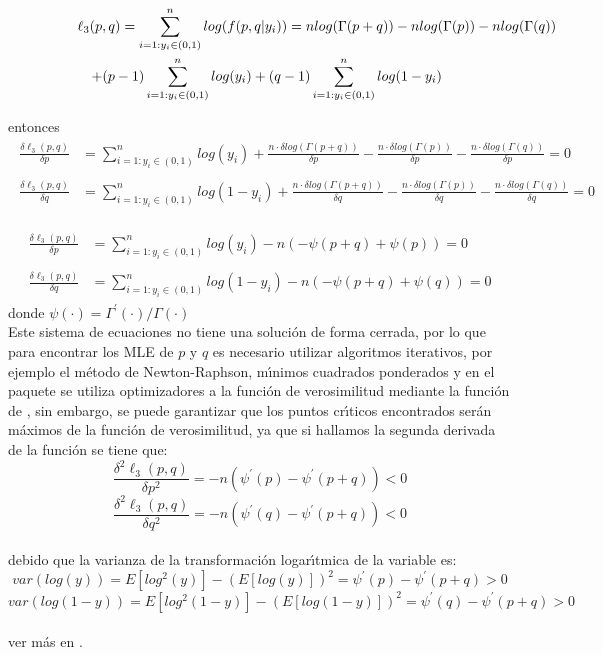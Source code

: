 \begin{enumerate}
\begin{eqnarray*}
 \lefteqn{\ell_3(p,q) = \sum_{i=1:y_i \in (0,1)}^{n}{log(f(p,q|y_i))} = n log(\Gamma(p+q))-n log(\Gamma(p))-n log(\Gamma(q))} \\
& & +(p-1)\sum_{i=1:y_i \in (0,1)}^{n}{log(y_i)}+(q-1)\sum_{i=1:y_i \in (0,1)}^{n}{log(1-y_i)}
\end{eqnarray*}

entonces
\begin{align*}
\begin{split}
\frac{\delta \ell_3(p,q)}{\delta p} &=\sum_{i=1:y_i \in (0,1)}^{n}{log(y_i)}+\frac{n \cdot \delta log(\Gamma(p+q))}{\delta p}- \frac{n \cdot \delta log(\Gamma(p))}{\delta p}-\frac{n\cdot \delta log(\Gamma(q))}{\delta p}=0
\end{split}\\
\begin{split}
\frac{\delta \ell_3(p,q)}{\delta q} &=\sum_{i=1:y_i \in (0,1)}^{n}{log(1-y_i)}+\frac{n \cdot \delta log(\Gamma(p+q))}{\delta q}- \frac{n \cdot \delta log(\Gamma(p))}{\delta q}-\frac{n\cdot \delta log(\Gamma(q))}{\delta q}=0
\end{split}
\end{align*}

\begin{align*}
\begin{split}
\frac{\delta \ell_3(p,q)}{\delta p} &=\sum_{i=1:y_i \in (0,1)}^{n}{log(y_i)}-n(-\psi(p+q)+\psi(p))=0
\end{split}\\
\begin{split}
\frac{\delta \ell_3(p,q)}{\delta q} &=\sum_{i=1:y_i \in (0,1)}^{n}{log(1-y_i)}-n(-\psi(p+q)+\psi(q))=0
\end{split}
\end{align*}
donde $\psi(\cdot)={\Gamma^{'}{(\cdot)}}/{\Gamma(\cdot)}$
\\
Este sistema de ecuaciones no tiene una soluci\'{o}n de forma cerrada, por lo que para encontrar los MLE de $p$ y $q$ es necesario utilizar algoritmos iterativos, por ejemplo el m\'{e}todo de Newton-Raphson, m\'{\i}nimos cuadrados ponderados y en el paquete  se utiliza optimizadores a la funci\'{o}n de verosimilitud mediante la funci\'{o}n  de , sin embargo, se puede garantizar que los puntos cr\'{\i}ticos encontrados ser\'{a}n m\'{a}ximos de la funci\'{o}n de verosimilitud, ya que si hallamos la segunda derivada de la funci\'{o}n se tiene que:
\[
\frac{\delta^2 \ell_3(p,q)}{\delta p^2}=-n(\psi^{'}(p)-\psi^{'}(p+q))<0
\]
\[
\frac{\delta^2 \ell_3(p,q)}{\delta q^2}=-n(\psi^{'}(q)-\psi^{'}(p+q))<0
\]
\\
debido que la varianza de la transformaci\'{o}n logar\'{\i}tmica de la variable es:
\[
var(log(y))=E[log^2(y)]-(E[log(y)])^2=\psi^{'}(p)-\psi^{'}(p+q)>0
\]
\[
var(log(1-y))=E[log^2(1-y)]-(E[log(1-y)])^2=\psi^{'}(q)-\psi^{'}(p+q)>0
\]
\\
ver m\'{a}s en \cite{Owen1}.\\


\end{enumerate}
